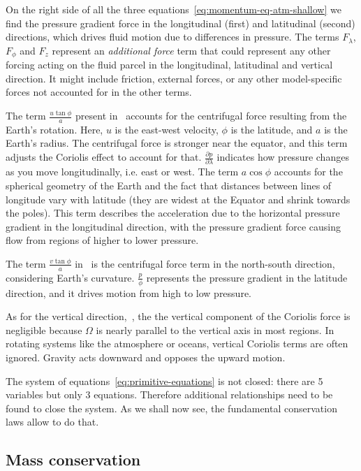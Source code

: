 On the right side of all the three equations~\ref{eq:momentum-eq-atm-shallow} we find the pressure gradient force in the
longitudinal (first) and latitudinal (second) directions, which drives fluid motion
due to differences in pressure.
The terms $F_{\lambda}$, $F_{\phi}$ and $F_{z}$ represent an \emph{additional force} term that could represent any other forcing acting on the fluid parcel in the longitudinal, latitudinal and vertical direction.
It might include friction, external forces, or any other model-specific forces not accounted for in the other terms.

The term $\frac{u\tan\phi}{a}$ present in~\eq{\ref{eq:momentum-shallow-u}} accounts for the centrifugal force resulting
from the Earth's rotation.
Here, $u$ is the east-west velocity, $\phi$ is the latitude, and $a$ is the Earth's radius.
The centrifugal force is stronger near the equator, and this term adjusts the Coriolis effect to account for that.
$\frac{\partial p}{\partial\lambda}$ indicates how pressure changes as you move longitudinally, i.e. east or west.
The term $a\cos\phi$ accounts for the spherical geometry of the Earth and the fact that distances between lines of longitude vary with latitude (they are widest at the Equator and shrink towards the poles). This term describes the acceleration due to the horizontal pressure gradient in the longitudinal direction, with the pressure gradient force causing flow from regions of higher to lower pressure.

The term $\frac{v\tan\phi}{a}$ in~\eq{\ref{eq:momentum-shallow-v}} is the centrifugal force term in the north-south direction,
considering Earth's curvature.
$\frac{p}{\phi}$ represents the pressure gradient in the latitude direction, and it drives motion from high to low pressure.

As for the vertical direction,~\eq{\ref{eq:momentum-shallow-w}}, the the vertical component of the Coriolis force is negligible
because $\Omega$ is nearly parallel to the vertical axis in most regions.
In rotating systems like the atmosphere or oceans, vertical Coriolis terms are often ignored.
Gravity acts downward and opposes the upward motion.


The system of equations~\ref{eq:primitive-equations} is not closed: there are 5 variables but only 3 equations.
Therefore additional relationships need to be found to close the system.
As we shall now see, the fundamental conservation laws allow to do that.

\subsection{Mass conservation}\label{subsec:mass-conservation}

